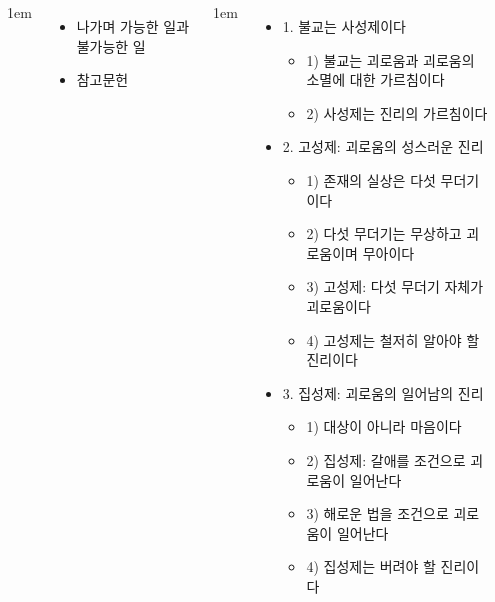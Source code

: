 \documentclass[	17pt, 
							a1paper, 
							portrait, %
							margin=0mm, %
							innermargin=10mm,  		%
							colspace=5mm, 
							subcolspace=0mm
							]{tikzposter}
\begin{document}
\begin{columns}
{\begin{itemize}
					\end{itemize}
			}

			{
					\setlength{\leftmargini}{2em}
					\setlength{\labelsep} {1em}
					\begin{itemize}

					\item 나가며  가능한 일과 불가능한 일
					\item 참고문헌
					\end{itemize}
			} %




			{
					\setlength{\leftmargini}{2em}
					\setlength{\labelsep} {1em}
					\begin{itemize}

					\item 1. 불교는 사성제이다
						\begin{itemize}
						\item 1) 불교는 괴로움과 괴로움의 소멸에 대한 가르침이다
						\item 2) 사성제는 진리의 가르침이다
						\end{itemize}
					\item 2. 고성제: 괴로움의 성스러운 진리
						\begin{itemize}
						\item 1) 존재의 실상은 다섯 무더기이다
						\item 2) 다섯 무더기는 무상하고 괴로움이며 무아이다
						\item 3) 고성제: 다섯 무더기 자체가 괴로움이다
						\item 4) 고성제는 철저히 알아야 할 진리이다
						\end{itemize}

					\item 3. 집성제: 괴로움의 일어남의 진리
						\begin{itemize}
						\item 1) 대상이 아니라 마음이다
						\item 2) 집성제: 갈애를 조건으로 괴로움이 일어난다
						\item 3) 해로운 법을 조건으로 괴로움이 일어난다
						\item 4) 집성제는 버려야 할 진리이다
						\end{itemize}


\end{itemize}}
\end{columns}
\end{document}
